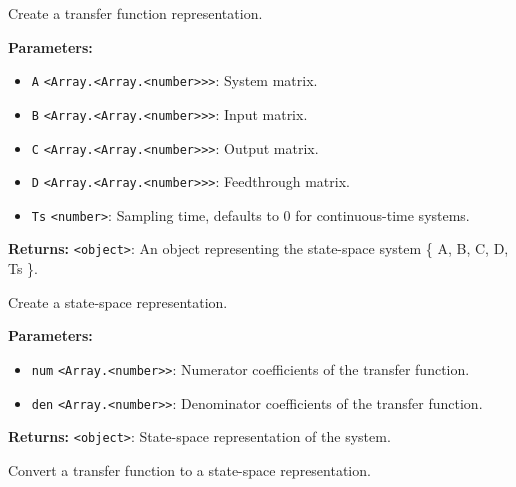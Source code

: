 \documentclass[12pt,a4paper]{article}
\begin{document}
\noindent Create a transfer function representation.

\vspace{5mm}
\noindent {}


\noindent \textbf{Parameters:}
\begin{itemize}
  \item \texttt{A} \texttt{<Array.<Array.<number>>>}: System matrix.
  \item \texttt{B} \texttt{<Array.<Array.<number>>>}: Input matrix.
  \item \texttt{C} \texttt{<Array.<Array.<number>>>}: Output matrix.
  \item \texttt{D} \texttt{<Array.<Array.<number>>>}: Feedthrough matrix.
  \item \texttt{Ts} \texttt{<number>}: Sampling time, defaults to 0 for continuous-time systems.
\end{itemize}

\noindent \textbf{Returns:} \texttt{<object>}: An object representing the state-space system \{ A, B, C, D, Ts \}.

\noindent Create a state-space representation.

\vspace{5mm}
\noindent {}


\noindent \textbf{Parameters:}
\begin{itemize}
  \item \texttt{num} \texttt{<Array.<number>>}: Numerator coefficients of the transfer function.
  \item \texttt{den} \texttt{<Array.<number>>}: Denominator coefficients of the transfer function.
\end{itemize}

\noindent \textbf{Returns:} \texttt{<object>}: State-space representation of the system.

\noindent Convert a transfer function to a state-space representation.

\vspace{5mm}
\noindent {}
\end{document}
